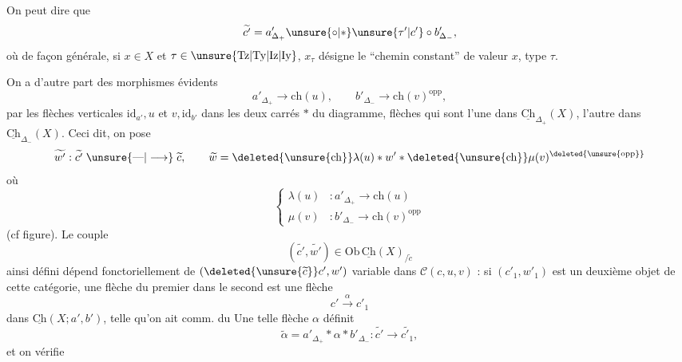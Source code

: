 On peut dire que
\[
\widetilde{c'}=a'_{\Delta_+}\unsure{\circ|*}\unsure{\tau'|c'}\circ b'_{\Delta_-},
\]
où de façon générale, si $x\in X$ et $\tau\in\unsure{\mathrm{Tz}|\mathrm{Ty}|\mathrm{Iz}|\mathrm{Iy}}$, $x_\tau$ désigne le ``chemin constant'' de valeur $x$, type $\tau$.

On a d'autre part des morphismes évidents
\[
a'_{\Delta_+}\longrightarrow\mathrm{ch}(u),\qquad b'_{\Delta_-}\longrightarrow\mathrm{ch}(v)^{\mathrm{opp}},
\]
 par les flèches verticales $\mathrm{id}_{a'},u$ et $v,\mathrm{id}_{b'}$ dans les deux carrés  $*$ du diagramme, flèches qui sont l'une dans $\underline{\mathrm{Ch}}_{\Delta_+}(X)$, l'autre dans $\underline{\mathrm{Ch}}_{\Delta_-}(X)$. Ceci dit, on pose
\[
\widetilde{w'}:\widetilde{c'}\mathrel{\unsure{\text{---}|\longrightarrow}}\widetilde c,\qquad
\widetilde w=\deleted{\unsure{\mathrm{ch}}}\lambda(u)*w'*\deleted{\unsure{\mathrm{ch}}}\mu(v)^{\deleted{\unsure{\mathrm{opp}}}}
\]
où
\[
\left\{\begin{aligned}
\lambda(u)&:a'_{\Delta_+}\longrightarrow\mathrm{ch}(u)\\
\mu(v)&:b'_{\Delta_-}\longrightarrow\mathrm{ch}(v)^{\mathrm{opp}}
\end{aligned}\right.
\]
(cf figure). Le couple
\[
(\widetilde{c'},\widetilde{w'})\in\mathrm{Ob}\,\underline{\mathrm{Ch}}(X)_{/\widetilde c}
\]
ainsi défini dépend fonctoriellement de $(\deleted{\unsure{\widetilde c}}c',w')$ variable dans $\mathcal C(c,u,v)$ : si $(c'_1,w'_1)$ est un deuxième objet de cette catégorie, une flèche du premier dans le second est une flèche \unsure{$\alpha$}
\[
c'\xrightarrow{\alpha}c'_1
\]
dans $\underline{\mathrm{Ch}}(X;a',b')$, telle qu'on ait comm. du
Une telle flèche $\alpha$ définit
\[
\widetilde\alpha=a'_{\Delta_+}*\alpha*b'_{\Delta_-}:\widetilde{c'}\longrightarrow\widetilde{c'_1},
\]
 et on vérifie
